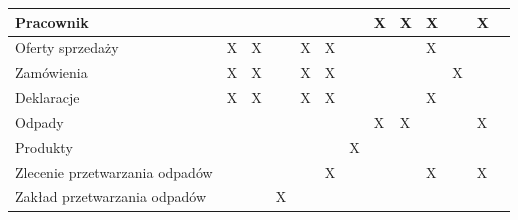 \begin{landscape}
\begin{table}[H]
{\begin{tabularx}{1.1\hsize}{@{}|Y|Y|Y|Y|Y|Y|Y|Y|Y|Y|Y|Y|Y@{}}
Pracownik                                            &                       &                       &                        &                       &                        &                       & X                     & X                     & X                      &                       & X                                                   &                                                   \\ \hline
Oferty sprzedaży                                     & X                     & X                     &                        & X                     & X                      &                       &                       &                       & X                      &                       &                                                     &                                                   \\ \hline
Zamówienia                                           & X                     & X                     &                        & X                     & X                      &                       &                       &                       &                        & X                     &                                                     &                                                   \\ \hline
Deklaracje                                           & X                     & X                     &                        & X                     & X                      &                       &                       &                       & X                      &                       &                                                     &                                                   \\ \hline
Odpady                                               &                       &                       &                        &                       &                        &                       & X                     & X                     &                        &                       & X                                                   &                                                   \\ \hline
Produkty                                             &                       &                       &                        &                       &                        & X                     &                       &                       &                        &                       &	                                                     &                                                   \\ \hline
Zlecenie przetwarzania odpadów &  &	& 	&	&	X &		 &		 &		 &X & 	                   & X                                                 \\ \hline
Zakład przetwarzania odpadów   & 	 & 	& X		 & 		 & 		  & 		 & 		 & 		 & 		  & 	 &                                            \\ \hline
		\end{tabularx}}
	\end{table}
\end{landscape}

